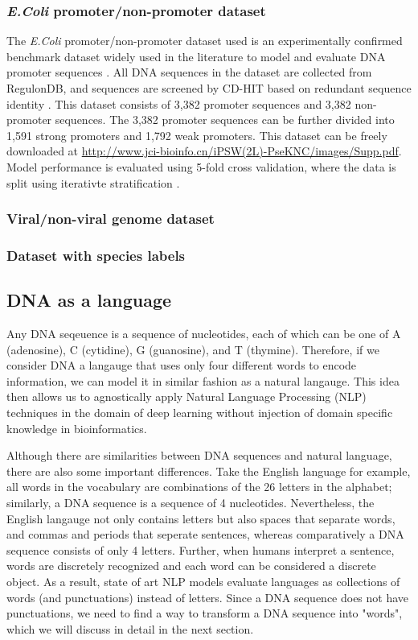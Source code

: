 \documentclass{article}
\begin{document}
\subsubsection{\textit{E.Coli} promoter/non-promoter dataset}
The \textit{E.Coli} promoter/non-promoter dataset used is an experimentally confirmed benchmark dataset widely used in the literature to model and evaluate DNA promoter sequences \cite{ipsw}. All DNA sequences in the dataset are collected from RegulonDB, and sequences are screened by CD-HIT based on redundant sequence identity \cite{cdhit}. This dataset consists of 3,382 promoter sequences and 3,382 non-promoter sequences. The 3,382 promoter sequences can be further divided into 1,591 strong promoters and 1,792 weak promoters. This dataset can be freely downloaded at \href{http://www.jci-bioinfo.cn/iPSW(2L)-PseKNC/images/Supp.pdf}{http://www.jci-bioinfo.cn/iPSW(2L)-PseKNC/images/Supp.pdf}. Model performance is evaluated using 5-fold cross validation, where the data is split using iterativte stratification \cite{iter_strat}.


\subsubsection{Viral/non-viral genome dataset}


\subsubsection{Dataset with species labels}




\subsection{DNA as a language}
Any DNA seqeuence is a sequence of nucleotides, each of which can be one of A (adenosine), C (cytidine), G (guanosine), and T (thymine). Therefore, if we consider DNA a langauge that uses only four different words to encode information, we can model it in similar fashion as a natural langauge. This idea then allows us to agnostically apply Natural Language Processing (NLP) techniques in the domain of deep learning without injection of domain specific knowledge in bioinformatics.  

Although there are similarities between DNA sequences and natural language, there are also some important differences. Take the English language for example, all words in the vocabulary are combinations of the 26 letters in the alphabet; similarly, a DNA sequence is a sequence of 4 nucleotides. Nevertheless, the English langauge not only contains letters but also spaces that separate words, and commas and periods that seperate sentences, whereas comparatively a DNA sequence consists of only 4 letters. Further, when humans interpret a sentence, words are discretely recognized and each word can be considered a discrete object. As a result, state of art NLP models evaluate languages as collections of words (and punctuations) instead of letters. Since a DNA sequence does not have punctuations, we need to find a way to transform a DNA sequence into "words", which we will discuss in detail in the next section.
\end{document}
